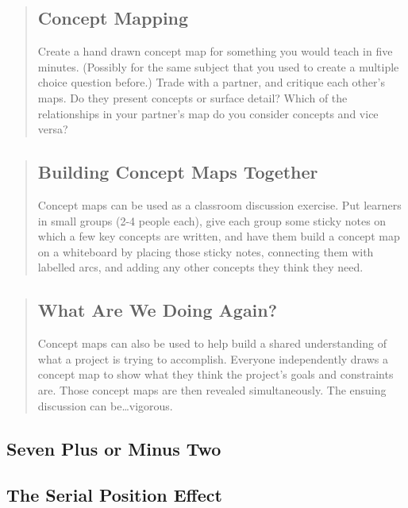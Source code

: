 \begin{quotation}   %
\subsection*{Concept Mapping}

Create a hand drawn concept map for something you would teach in five minutes.
(Possibly for the same subject that you used to create a multiple choice question
before.)
Trade with a partner, and critique each other's maps.
Do they present concepts or surface detail?
Which of the relationships in your partner's map do you consider concepts and vice versa?
\end{quotation}   %

\begin{quotation}   %
\subsection*{Building Concept Maps Together}

Concept maps can be used as a classroom discussion exercise.
Put learners in small groups (2-4 people each),
give each group some sticky notes on which a few key concepts are written,
and have them build a concept map on a whiteboard by placing those sticky notes,
connecting them with labelled arcs,
and adding any other concepts they think they need.
\end{quotation}   %

\begin{quotation}   %
\subsection*{What Are We Doing Again?}

Concept maps can also be used to help build a shared understanding of what a project is trying to accomplish.
Everyone independently draws a concept map to show what they think the project's goals and constraints are.
Those concept maps are then revealed simultaneously.
The ensuing discussion can be\ldots{}vigorous.
\end{quotation}   %

\subsection*{Seven Plus or Minus Two}

\subsection*{The Serial Position Effect}

